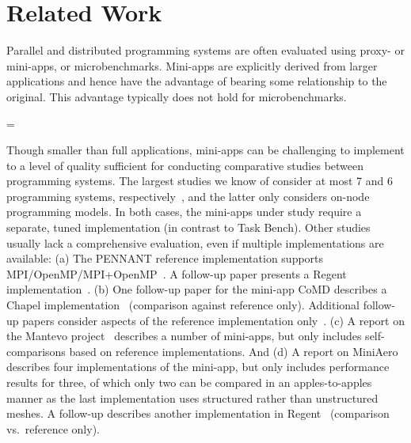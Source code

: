 \section{Related Work}
\label{sec:related-work}

{}

Parallel and distributed programming systems are often
evaluated using proxy- or mini-apps, or
microbenchmarks. Mini-apps are explicitly derived from larger
applications and hence have the advantage of bearing some
relationship to the original. This advantage typically does not hold
for microbenchmarks.

\brokenpenalty=\oldbrokenpenalty



Though smaller than full applications, mini-apps can be challenging to
implement to a level of quality sufficient for conducting comparative
studies between programming systems. {\color{blue} The largest studies
we know of consider at most 7 and 6 programming systems,
respectively~\cite{LULESH13, Deakin19}, and the latter only considers
on-node programming models.} In both cases, the mini-apps under study
require a separate, tuned implementation (in contrast to Task
Bench). Other studies usually lack a comprehensive evaluation, even if
multiple implementations are available:
(a) The PENNANT reference implementation supports
MPI/OpenMP/MPI+OpenMP~\cite{PENNANT}. A follow-up paper presents a
Regent implementation~\cite{Regent15}.
(b) One follow-up paper for the mini-app CoMD describes a Chapel
implementation~\cite{CoMDChapel16} (comparison against reference
only). Additional follow-up papers consider aspects of the reference
implementation only~\cite{CoMDLoadImbalance17,
  CoMDThreadedModels14}.
(c) A report on the Mantevo project~\cite{Mantevo09} describes a number of
mini-apps, but only includes self-comparisons based on reference
implementations.
And (d) A report on MiniAero~\cite{SandiaReportManyTaskRuntimes15} describes
four implementations of the mini-app, but only includes performance
results for three, of which only two can be compared in an
apples-to-apples manner as the last implementation uses structured
rather than unstructured meshes. A follow-up describes another
implementation in Regent~\cite{Regent15} (comparison vs.~reference
only).

